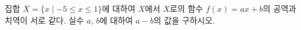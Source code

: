 집합 $X=\{x \mid -5\le x\le 1\}$에 대하여 $X$에서 $X$로의 함수 $f(x)=ax+b$의 공역과 치역이 서로 같다. 실수 $a$, $b$에 대하여 $a-b$의 값을 구하시오. 
